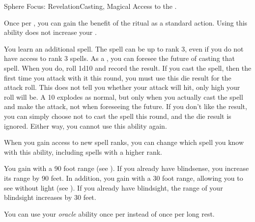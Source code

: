   \begin{magicalfeat}{Sphere Focus: Revelation}{Casting, Magical}
    \featpre Access to the  .

     Once per , you can gain the benefit of the  ritual as a standard action.
    Using this ability does not increase your .

     You learn an additional spell.
    The spell can be up to rank 3, even if you do not have access to rank 3 spells.
    As a , you can foresee the future of casting that spell.
    When you do, roll 1d10 and record the result.
    If you cast the spell, then the first time you attack with it this round, you must use this die result for the attack roll.
    This does not tell you whether your attack will hit, only high your roll will be.
    A 10 explodes as normal, but only when you actually cast the spell and make the attack, not when foreseeing the future.
    If you don't like the result, you can simply choose not to cast the spell this round, and the die result is ignored.
    Either way, you  cannot use this ability again.

    When you gain access to new spell ranks, you can change which spell you know with this ability, including spells with a higher rank.

     You gain  with a 90 foot range (see ).
    If you already have blindsense, you increase its range by 90 feet.
    In addition, you gain  with a 30 foot range, allowing you to see without light (see ).
    If you already have blindsight, the range of your blindsight increases by 30 feet.

     You can use your \textit{oracle} ability once per  instead of once per long rest.
  \end{magicalfeat}

